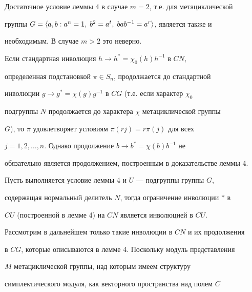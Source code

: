 \begin{note}


Достаточное условие леммы 4 в случае $m=2$, т.е. для метациклической


группы $G=\langle a,b:a^n=1,\;b^2=a^t,\;bab^{-1}=a^r\rangle$, является также и


необходимым. В случае $m>2$ это неверно.


\end{note}





\begin{note}


Если стандартная инволюция $h\to h^*=\chi_0(h)h^{-1}$ в $CN$,


определенная подстановкой $\pi\in S_n$, продолжается до стандартной


инволюции $g\to g^*=\chi(g)g^{-1}$ в $CG$ (т.е. если характер $\chi_0$


подгруппы $N$ продолжается до характера $\chi$ метациклической группы


$G$), то $\pi$ удовлетворяет условиям $\pi(rj)=r\pi(j)$ для всех


$j=1,2,\dotsc,n$. Однако продолжение $b\to b^*=\chi(b)b^{-1}$ не


обязательно является продолжением, построенным в доказательстве леммы 4.


\end{note}





\begin{note}


Пусть выполняется условие леммы 4 и $U$ --- подгруппы группы $G$,


содержащая нормальный делитель $N$, тогда ограничение инволюции $*$ в


$CU$ (построенной в лемме 4) на $CN$ является инволюцией в $CU$.


\end{note}





Рассмотрим в дальнейшем только такие инволюции в $CN$ и их продолжения


в $CG$, которые описываются в лемме 4. Поскольку модуль представления


$M$ метациклической группы, над которым имеем структуру


симплектического модуля, как векторного пространства над полем $C$


